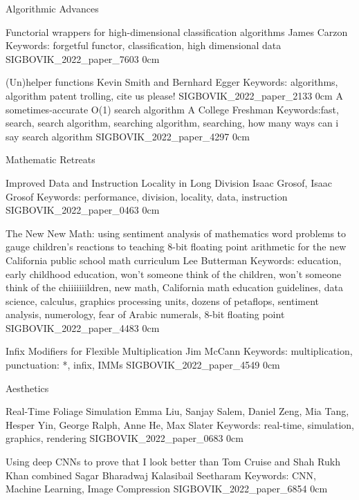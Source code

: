 \addtrack
    {}{Algorithmic Advances}

\addpaper
    {Functorial wrappers for high-dimensional classification algorithms}
    {James Carzon}
    {Keywords: forgetful functor, classification, high dimensional data}
    {SIGBOVIK_2022_paper_7603}
    {0cm}
    {}

\addpaper
    {(Un)helper functions}
    {Kevin Smith and Bernhard Egger}
    {Keywords: algorithms, algorithm patent trolling, cite us please!}
    {SIGBOVIK_2022_paper_2133}
    {0cm}
    {}
\addpaper
    {A sometimes-accurate O(1) search algorithm}
    {A College Freshman}
    {Keywords:fast, search, search algorithm, searching algorithm, searching, how many ways can i say search algorithm}
    {SIGBOVIK_2022_paper_4297}
    {0cm}
    {}

\addtrack
    {}{Mathematic Retreats}

\addpaper
    {Improved Data and Instruction Locality in Long Division}
    {Isaac Grosof, Isaac Grosof}
    {Keywords: performance, division, locality, data, instruction}
    {SIGBOVIK_2022_paper_0463}
    {0cm}
    {}

\addpaper
    {The New New Math: using sentiment analysis of mathematics word problems to gauge children's reactions to teaching 8-bit floating point arithmetic for the new California public school math curriculum}
    {Lee Butterman}
    {Keywords: education, early childhood education, won't someone think of the children, won't someone think of the chiiiiiiildren, new math, California math education guidelines, data science, calculus, graphics processing units, dozens of petaflops, sentiment analysis, numerology, fear of Arabic numerals, 8-bit floating point}
    {SIGBOVIK_2022_paper_4483}
    {0cm}
    {}

\addpaper
    {Infix Modifiers for Flexible Multiplication}
    {Jim McCann}
    {Keywords: multiplication, punctuation: *, infix, IMMs}
    {SIGBOVIK_2022_paper_4549}
    {0cm}
    {}

\addtrack
    {}{Aesthetics}

\addpaper
    {Real-Time Foliage Simulation}
    {Emma Liu, Sanjay Salem, Daniel Zeng, Mia Tang, Hesper Yin, George Ralph, Anne He, Max Slater}
    {Keywords: real-time, simulation, graphics, rendering}
    {SIGBOVIK_2022_paper_0683}
    {0cm}
    {}

\addpaper
    {Using deep CNNs to prove that I look better than Tom Cruise and Shah Rukh Khan combined}
    {Sagar Bharadwaj Kalasibail Seetharam}
    {Keywords: CNN, Machine Learning, Image Compression}
    {SIGBOVIK_2022_paper_6854}
    {0cm}
    {}

